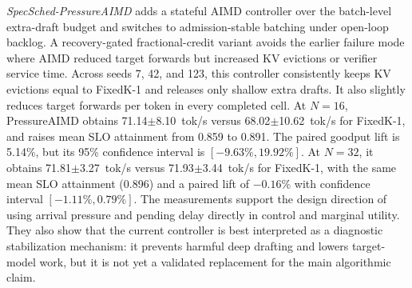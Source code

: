 \documentclass[10pt,journal,onecolumn]{IEEEtran}
\newcommand{\system}{SpecSched}
\begin{document}
\textit{\system{}-PressureAIMD} adds a stateful AIMD controller over
the batch-level extra-draft budget and switches to admission-stable
batching under open-loop backlog. A recovery-gated fractional-credit
variant avoids the earlier failure mode where AIMD reduced target
forwards but increased KV evictions or verifier service time. Across
seeds 7, 42, and 123, this controller consistently keeps KV evictions
equal to FixedK-1 and releases only shallow extra drafts. It also
slightly reduces target forwards per token in every completed cell.
At $N=16$, PressureAIMD obtains
71.14$\pm$8.10~tok/s versus 68.02$\pm$10.62~tok/s for FixedK-1, and
raises mean SLO attainment from 0.859 to 0.891. The paired goodput lift
is 5.14\%, but its 95\% confidence interval is
$[-9.63\%, 19.92\%]$. At $N=32$, it obtains
71.81$\pm$3.27~tok/s versus 71.93$\pm$3.44~tok/s for FixedK-1, with
the same mean SLO attainment (0.896) and a paired lift of $-0.16\%$
with confidence interval $[-1.11\%, 0.79\%]$. The measurements support
the design direction of using arrival pressure and pending delay
directly in control and marginal utility. They also show that the
current controller is best interpreted as a diagnostic stabilization
mechanism: it prevents harmful deep drafting and lowers target-model
work, but it is not yet a validated replacement for the main
algorithmic claim.




\end{document}
